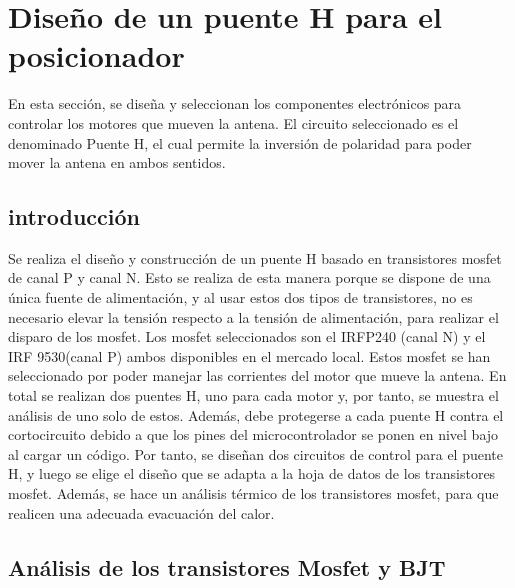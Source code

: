 \renewcommand{\chaptername}{Diseño de un puente H para el posicionador}
\graphicspath{{parte_4/puente_h/}}
\chapter{Diseño de un puente H para el posicionador} \label{cap:driver_motores}
\begin{center}
	\begin{tcolorbox}[colback=gray!5!white, %
		colframe=blue!75!black,
		title= \center{\Large{Resumen}} ]
		En esta sección, se diseña y seleccionan los componentes electrónicos para controlar los motores que mueven la antena. El circuito seleccionado es el denominado Puente H, el cual permite la inversión de polaridad para poder mover la antena en ambos sentidos. 
	\end{tcolorbox}
\end{center}    


\section{introducción}
	
	Se realiza el diseño y construcción de un puente H basado en transistores mosfet de canal P y canal N. Esto se realiza de esta manera porque se dispone de una única fuente de alimentación, y al usar estos dos tipos de transistores, no es necesario elevar la tensión respecto a la tensión de alimentación, para realizar el disparo de los mosfet. Los mosfet seleccionados son el IRFP240 (canal N) y el IRF 9530(canal P) ambos disponibles en el mercado local. Estos mosfet se han seleccionado por poder manejar las corrientes del motor que mueve la antena. En total se realizan dos puentes H, uno para cada motor y, por tanto, se muestra el análisis de uno solo de estos. Además, debe protegerse a cada puente H contra el cortocircuito debido a que los pines del microcontrolador se ponen en nivel bajo al cargar un código. Por tanto, se diseñan dos circuitos de control para el puente H, y luego se elige el diseño que se adapta a la hoja de datos de los transistores mosfet. Además, se hace un análisis térmico de los transistores mosfet, para que realicen una adecuada evacuación del calor.
	
	
\section{Análisis de los transistores Mosfet y BJT} 

